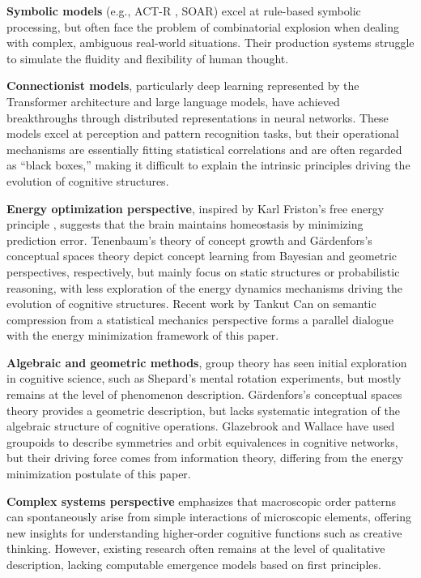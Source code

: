 \documentclass[10pt,onecolumn]{article}
\begin{document}
\textbf{Symbolic models} (e.g., ACT-R \cite{anderson2004act}, SOAR) excel at rule-based symbolic processing, but often face the problem of combinatorial explosion when dealing with complex, ambiguous real-world situations. Their production systems struggle to simulate the fluidity and flexibility of human thought.

\textbf{Connectionist models}, particularly deep learning \cite{lecun2015deep} represented by the Transformer architecture \cite{vaswani2017attention} and large language models, have achieved breakthroughs through distributed representations in neural networks. These models excel at perception and pattern recognition tasks, but their operational mechanisms are essentially fitting statistical correlations and are often regarded as “black boxes,” making it difficult to explain the intrinsic principles driving the evolution of cognitive structures.

\textbf{Energy optimization perspective}, inspired by Karl Friston’s free energy principle \cite{friston2010free}, suggests that the brain maintains homeostasis by minimizing prediction error. Tenenbaum’s theory of concept growth \cite{tenenbaum2011grow} and Gärdenfors’s conceptual spaces theory \cite{gardenfors2004conceptual} depict concept learning from Bayesian and geometric perspectives, respectively, but mainly focus on static structures or probabilistic reasoning, with less exploration of the energy dynamics mechanisms driving the evolution of cognitive structures. Recent work by Tankut Can \cite{can2025statistical} on semantic compression from a statistical mechanics perspective forms a parallel dialogue with the energy minimization framework of this paper.

\textbf{Algebraic and geometric methods}, group theory \cite{rotman1995theory} has seen initial exploration in cognitive science, such as Shepard’s mental rotation experiments, but mostly remains at the level of phenomenon description. Gärdenfors’s conceptual spaces theory provides a geometric description, but lacks systematic integration of the algebraic structure of cognitive operations. Glazebrook and Wallace \cite{glazebrook2009small} have used groupoids to describe symmetries and orbit equivalences in cognitive networks, but their driving force comes from information theory, differing from the energy minimization postulate of this paper.

\textbf{Complex systems perspective} emphasizes that macroscopic order patterns can spontaneously arise from simple interactions of microscopic elements, offering new insights for understanding higher-order cognitive functions such as creative thinking. However, existing research often remains at the level of qualitative description, lacking computable emergence models based on first principles.
\end{document}
